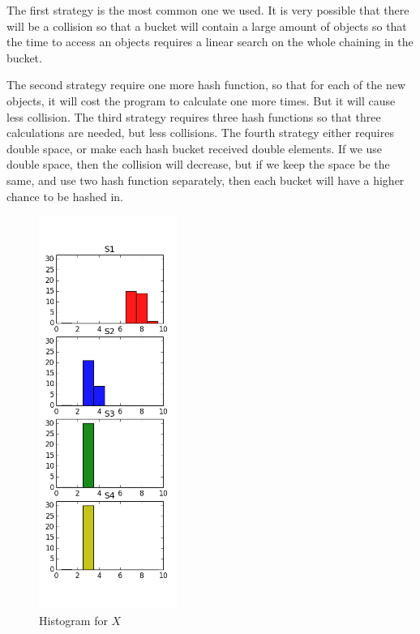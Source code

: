 \documentclass[12pt]{article}
\begin{document}
\begin{enumerate}[label=(\alph*)]


The first strategy is the most common one we used. It is very possible that there will be a collision so that a bucket will contain a large amount of objects so that the time to access an objects requires a linear search on the whole chaining in the bucket.

The second strategy require one more hash function, so that for each of the new objects, it will cost the program to calculate one more times. But it will cause less collision.
The third strategy requires three hash functions so that three calculations are needed, but less collisions.
The fourth strategy either requires double space, or make each hash bucket received double elements. If we use double space, then the collision will decrease, but if we keep the space be the same, and use two hash function separately, then each bucket will have a higher chance to be hashed in.
\end{enumerate}

\begin{figure}[h]
	\centering
	\includegraphics[width=0.4\textwidth]{figure_1.png}
	\caption{Histogram for $X$}
	\label{fig:plot}
\end{figure}
\end{document}
